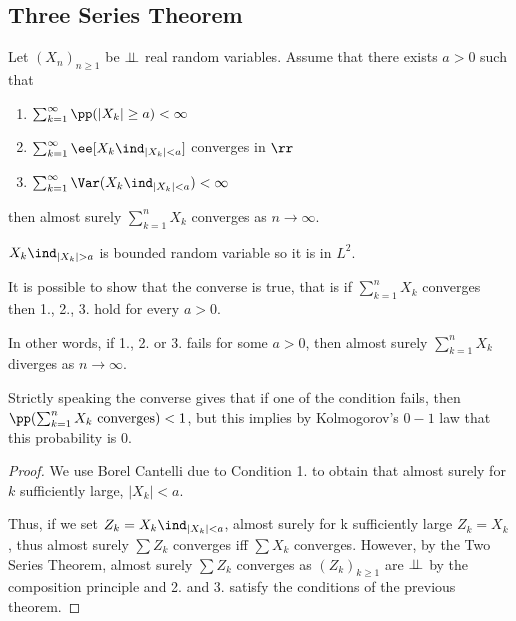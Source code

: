 \documentclass[../main.tex]{subfiles}
\begin{document}
   \subsection{Three Series Theorem}
   \begin{theorem}
     Let $(X_n)_{ n \geq 1}$ be $\perp\!\!\!\!\,\perp$ real random variables. Assume that
     there exists $a > 0$ such that
     \begin{enumerate}
       \item $\sum_{k =1}^\infty \pp(|X_k| \geq a) < \infty$
       \item $\sum_{k=1}^\infty \ee[X_k \ind_{|X_k| < a}]$ converges in $\rr$
       \item $\sum_{k=1}^\infty \Var(X_k \ind_{|X_k| < a}) < \infty$ 
     \end{enumerate}
     then almost surely $\sum_{k=1}^n X_k$ converges as $n \to \infty$.
   \end{theorem}
   \begin{remark}
     $X_k \ind_{|X_k| > a}$ is bounded random variable so it is in $L^2$.
   \end{remark}
   \begin{remark}
       It is possible to show that the converse is true, that is if
       $\sum_{k=1}^n X_k$ converges then 1., 2., 3. hold for every $a > 0$.

       \vspace{0.3em}

       \noindent In other words, if 1., 2. or 3. fails for some $a > 0$, then
       almost surely $\sum_{k=1}^n X_k$ diverges as $n \to \infty$.
   \end{remark}
   \begin{remark}
       Strictly speaking the converse gives that if one of the condition
       fails, then $\pp(\sum_{k=1}^n X_k \text{ converges}) < 1$, but this
       implies by Kolmogorov's $0-1$ law that this probability is $0$.
   \end{remark}
   \begin{proof}
      We use Borel Cantelli due to Condition 1. to obtain that almost surely
      for $k$ sufficiently large, $|X_k| < a$.

      \vspace{0.4em}

      Thus, if we set $Z_k = X_k \ind_{|X_k| < a}$, almost surely for k
      sufficiently large $Z_k = X_k$, thus almost surely $\sum Z_k$ converges
      iff $\sum X_k$ converges. However, by the Two Series Theorem, almost
      surely $\sum Z_k$ converges as $(Z_k)_{k \geq 1}$ are $\perp\!\!\!\!\,\perp$ by the
      composition principle and 2. and 3. satisfy the conditions of the
      previous theorem.
   \end{proof}
\end{document}
